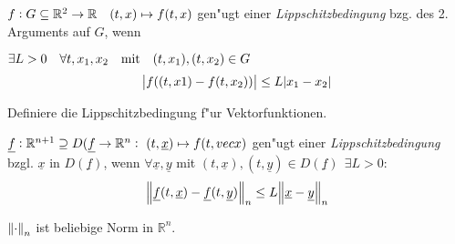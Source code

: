 \documentclass[9pt]{article}
\newcommand{\Rn}{\mathbb{R}^n}
\newcommand{\R}[1]{%
	\ifthenelse{\equal{#1}{}}
	{\mathbb{R}}
	{\mathbb{R}^{#1}}}%
\renewcommand{\vec}[1]{\underline{#1}}
\newenvironment{field}{}{\newpage}
\newif\ifnote
\newenvironment{note}{\notetrue}{\notefalse}
\newcommand{\localtag}{}
\newcommand{\globaltag}{}
\newcommand{\uuid}{}
\newcommand{\tags}[1]{
    \ifnote 
        \renewcommand{\localtag}{#1}
    \else
        \renewcommand{\globaltag}{#1}
    \fi 
    }
\newcommand{\xplain}[1]{\renewcommand{\uuid}{#1}}
\begin{document}
\begin{note}
	\xplain{97b4ffa4-d268-42a5-a0ca-51c3c4846cc8}  %
	\tags{definition, Lippschitz, 3.4.1, 3.4.8}
	
	\begin{field}  %
		 $f:G\subseteq \R{2} \rightarrow \R{} \quad (t,x) \mapsto f(t,x)$ gen"ugt einer
		 \textit{Lippschitzbedingung} bzg. des 2. Arguments auf $G$, wenn
	\end{field}  
	
	\begin{field}  %
		$\exists L>0 \quad \forall t, x_1, x_2 \qq{mit} (t,x_1), (t,x_2) \in G$
		\begin{equation*}
			 \abs{f((t,x1) - f(t,x_2))} \leq L\abs{x_1 -x_2}
		\end{equation*}
	\end{field}
		
	\begin{field}  %
		Definiere die Lippschitzbedingung f"ur Vektorfunktionen.
	\end{field}
	
	\begin{field}  %
		$\vec{f}: \R{n+1} \supseteq D(\vec{f} \rightarrow \R{n} :\  (t,\vec{x}) \mapsto f(t, vec{x})$
		gen"ugt einer \textit{Lippschitzbedingung} bzgl. $\vec{x}$ in $D(\vec{f})$, wenn
		$\forall \vec{x}, \vec{y}$ mit $(t,\vec{x}), (t,\vec{y}) \in D(\vec{f})  \ \ \exists L >0$:
		\begin{equation*}
			\norm{\vec{f}(t,\vec{x}) - \vec{f}(t, \vec{y})}_n \leq L \norm{\vec{x} - \vec{y}}_n
		\end{equation*}
		
		$\norm{\cdot}_n$ ist beliebige Norm in $\Rn$.
	\end{field}
\end{note}
\end{document}
